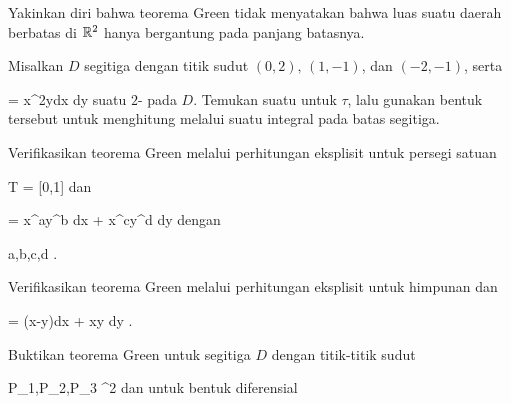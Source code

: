 {}
{

Yakinkan diri bahwa
teorema Green
tidak menyatakan bahwa luas suatu daerah berbatas di ${\mathbb R}^2$ hanya bergantung pada panjang batasnya.

}
{} {}

{}
{

Misalkan $D$ segitiga dengan titik sudut
$(0,2),\, (1,-1)$, dan $(-2,-1)$,
serta

\mavergleichskette
{\vergleichskette
{ \tau
}
{ = }{ x^2ydx \wedge dy
}
{  }{
}
{    }{
}
{   }{
}
}
{}{}{}
suatu
$2$- pada $D$. Temukan suatu
untuk $\tau$, lalu gunakan bentuk tersebut untuk menghitung
 melalui suatu integral pada batas segitiga.

}
{} {}

{}
{

Verifikasikan
teorema Green
melalui perhitungan eksplisit untuk persegi satuan

\mavergleichskette
{\vergleichskette
{ T
}
{ = }{ [0,1] \times [0,1]
}
{  }{
}
{    }{
}
{   }{
}
}
{}{}{}
dan

\mavergleichskettedisp
{\vergleichskette
{ \omega
}
{ =} { x^ay^b dx + x^cy^d dy
}
{ } {
}
{ } {
}
{ } {
}
}
{}{}{}
dengan

\mavergleichskette
{\vergleichskette
{ a,b,c,d
}
{ \in }{ \N
}
{  }{
}
{    }{
}
{   }{
}
}
{}{}{.}

}
{} {}

{}
{

Verifikasikan
teorema Green
melalui perhitungan eksplisit untuk himpunan
 {} {}
dan

\mavergleichskette
{\vergleichskette
{ \omega
}
{ = }{(x-y)dx + xy dy
}
{  }{
}
{    }{
}
{   }{
}
}
{}{}{.}

}
{} {}

{}
{

Buktikan teorema Green untuk segitiga $D$ dengan titik-titik sudut

\mavergleichskette
{\vergleichskette
{ P_1,P_2,P_3
}
{ \in }{ \R^2
}
{  }{
}
{    }{
}
{   }{
}
}
{}{}{}
dan untuk bentuk diferensial

}
{} {}

